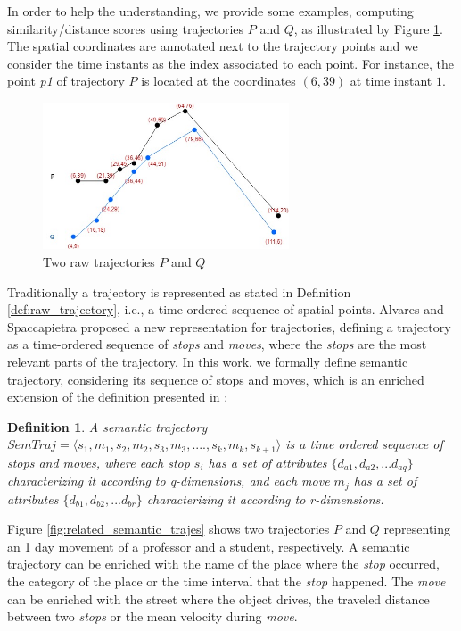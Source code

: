 \documentclass[12pt]{article}
\newtheorem{definition}{Definition}
\begin{document}
In order to help the understanding, we provide some examples, computing similarity/distance scores using trajectories $P$ and $Q$, as illustrated by Figure \ref{fig:related_trajes}. The spatial coordinates are annotated next to the trajectory points and we consider the time instants as the index associated to each point. For instance, the point \emph{p1} of trajectory $P$ is located at the coordinates $(6,39)$ at time instant $1$.

\begin{figure}[h]
\centering
\includegraphics[width=0.65\textwidth]{Related_Works/related_trajes.jpg}
\caption{\label{fig:related_trajes}Two raw trajectories $P$ and $Q$}
\end{figure}

Traditionally a trajectory is represented as stated in Definition \ref{def:raw_trajectory}, i.e., a time-ordered sequence of spatial points. Alvares \cite{alvares2007model} and Spaccapietra \cite{Spaccapietra:2008:CVT:1347466.1347785} proposed a new representation for trajectories, defining a trajectory as a time-ordered sequence of \emph{stops} and \emph{moves}, where the \emph{stops} are the most relevant parts of the trajectory.
In this work, we formally define semantic trajectory, considering its sequence of stops and moves, which is an enriched extension of the definition presented in \cite{Spaccapietra:2008:CVT:1347466.1347785}:

\begin{definition}
\label{def:semantic_trajectory}
A semantic trajectory  $SemTraj=\langle s_1, m_1, s_2, m_2, s_3,m_3, ...., s_k, m_k, s_{k+1} \rangle$ is a time ordered sequence of stops and moves, where each stop $s_i$ has a set of attributes $\{d_{a1}, d_{a2}, ...d_{aq}\}$ characterizing it according to q-dimensions, and each move $m_j$  has a set of attributes $\{d_{b1}, d_{b2}, ...d_{br}\}$ characterizing it according to r-dimensions. 
\end{definition}

Figure \ref{fig:related_semantic_trajes} shows two trajectories $P$ and $Q$ representing an 1 day movement of a professor and a student, respectively. A semantic trajectory can be enriched with the name of the place where the \emph{stop} occurred, the category of the place or the time interval that the \emph{stop} happened. The \emph{move} can be enriched with the street where the object drives, the traveled distance between two \emph{stops} or the mean velocity during \emph{move}.
\end{document}

